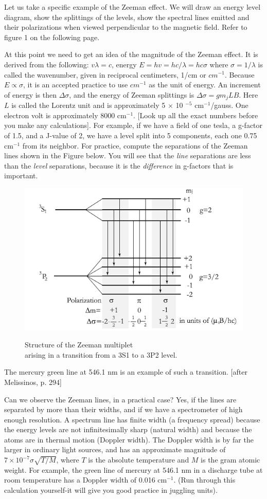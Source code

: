 \documentclass{../lab}
\begin{document}
Let us take a specific example of the Zeeman effect. We will draw an energy level diagram, show the splittings of the levels, show the spectral lines emitted and their polarizations when viewed perpendicular to the magnetic field. Refer to figure 1 on the following page.

At this point we need to get an idea of the magnitude of the Zeeman effect. It is derived from the following: $v \lambda = c$, energy $E = hv = hc / \lambda = hc \sigma$  where  $\sigma = 1 / \lambda$ is called the wavenumber, given in reciprocal centimeters, 1/cm or $cm^{-1}$. Because $E\propto\sigma$, it is an accepted practice to use $cm^{-1}$ as the unit of energy. An increment of energy is then $\Delta\sigma$, and the energy of Zeeman splittings is $\Delta\sigma = g m_j L B$. Here $L$ is called the Lorentz unit and is approximately 5 $\times$ 10 $^{-5}$ cm$^{-1}$/gauss. One electron volt is approximately 8000 cm$^{-1}$. [Look up all the exact numbers before you make any calculations]. For example, if we have a field of one tesla, a g-factor of 1.5, and a J-value of 2, we have a level split into 5 components, each one 0.75 cm$^{-1}$ from its neighbor. For practice, compute the separations of the Zeeman lines shown in the Figure below. You will see that the \emph{line} separations are less than the \emph{level} separations, because it is the \emph{difference} in g-factors that is important.

\begin{figure}[h]
    \centering
    \href{http://experimentationlab.berkeley.edu/sites/default/files/images/Atm1image003.gif}{\includegraphics[width=0.5\linewidth]{images/Atm1image003.png}}
    \caption{Structure of the Zeeman multiplet \\ arising in a transition from a 3S1 to a 3P2 level.}
    \label{fig:Atm1image003}
\end{figure}

The mercury green line at 546.1 nm is an example of such a transition. [after Melissinos, p. 294]

Can we observe the Zeeman lines, in a practical case? Yes, if the lines are separated by more than their widths, and if we have a spectrometer of high enough resolution. A spectrum line has finite width (a frequency spread) because the energy levels are not infinitesimally sharp (natural width) and because the atoms are in thermal motion (Doppler width). The Doppler width is by far the larger in ordinary light sources, and has an approximate magnitude of $7 \times 10^{-7} \sigma \sqrt{T/M}$, where $T$ is the absolute temperature and $M$ is the gram atomic weight. For example, the green line of mercury at 546.1 nm in a discharge tube at room temperature has a Doppler width of 0.016 cm$^{-1}$. (Run through this calculation yourself-it will give you good practice in juggling units).
\end{document}
